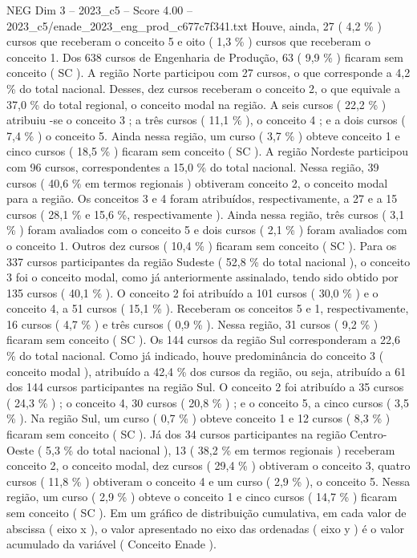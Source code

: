 \begin{textsample}{NEG Dim 3 – 2023\_c5 – Score 4.00 – 2023\_c5/enade\_2023\_eng\_prod\_c677c7f341.txt}
Houve, ainda, 27 ( 4,2 \% ) cursos que receberam o conceito 5 e oito ( 1,3 \% ) cursos que receberam o conceito 1.
Dos 638 cursos de Engenharia de Produção, 63 ( 9,9 \% ) ficaram sem conceito ( SC ).
A região Norte participou com 27 cursos, o que corresponde a 4,2 \% do total nacional.
Desses, dez cursos receberam o conceito 2, o que equivale a 37,0 \% do total regional, o conceito modal na região.
A seis cursos ( 22,2 \% ) atribuiu -se o conceito 3 ; a três cursos ( 11,1 \% ), o conceito 4 ; e a dois cursos ( 7,4 \% ) o conceito 5.
Ainda nessa região, um curso ( 3,7 \% ) obteve conceito 1 e cinco cursos ( 18,5 \% ) ficaram sem conceito ( SC ).
A região Nordeste participou com 96 cursos, correspondentes a 15,0 \% do total nacional.
Nessa região, 39 cursos ( 40,6 \% em termos regionais ) obtiveram conceito 2, o conceito modal para a região.
Os conceitos 3 e 4 foram atribuídos, respectivamente, a 27 e a 15 cursos ( 28,1 \% e 15,6 \%, respectivamente ).
Ainda nessa região, três cursos ( 3,1 \% ) foram avaliados com o conceito 5 e dois cursos ( 2,1 \% ) foram avaliados com o conceito 1.
Outros dez cursos ( 10,4 \% ) ficaram sem conceito ( SC ).
Para os 337 cursos participantes da região Sudeste ( 52,8 \% do total nacional ), o conceito 3 foi o conceito modal, como já anteriormente assinalado, tendo sido obtido por 135 cursos ( 40,1 \% ).
O conceito 2 foi atribuído a 101 cursos ( 30,0 \% ) e o conceito 4, a 51 cursos ( 15,1 \% ).
Receberam os conceitos 5 e 1, respectivamente, 16 cursos ( 4,7 \% ) e três cursos ( 0,9 \% ).
Nessa região, 31 cursos ( 9,2 \% ) ficaram sem conceito ( SC ).
Os 144 cursos da região Sul corresponderam a 22,6 \% do total nacional.
Como já indicado, houve predominância do conceito 3 ( conceito modal ), atribuído a 42,4 \% dos cursos da região, ou seja, atribuído a 61 dos 144 cursos participantes na região Sul.
O conceito 2 foi atribuído a 35 cursos ( 24,3 \% ) ; o conceito 4, 30 cursos ( 20,8 \% ) ; e o conceito 5, a cinco cursos ( 3,5 \% ).
Na região Sul, um curso ( 0,7 \% ) obteve conceito 1 e 12 cursos ( 8,3 \% ) ficaram sem conceito ( SC ).
Já dos 34 cursos participantes na região Centro-Oeste ( 5,3 \% do total nacional ), 13 ( 38,2 \% em termos regionais ) receberam conceito 2, o conceito modal, dez cursos ( 29,4 \% ) obtiveram o conceito 3, quatro cursos ( 11,8 \% ) obtiveram o conceito 4 e um curso ( 2,9 \% ), o conceito 5.
Nessa região, um curso ( 2,9 \% ) obteve o conceito 1 e cinco cursos ( 14,7 \% ) ficaram sem conceito ( SC ).
Em um gráfico de distribuição cumulativa, em cada valor de abscissa ( eixo x ), o valor apresentado no eixo das ordenadas ( eixo y ) é o valor acumulado da variável ( Conceito Enade ).

\end{textsample}
